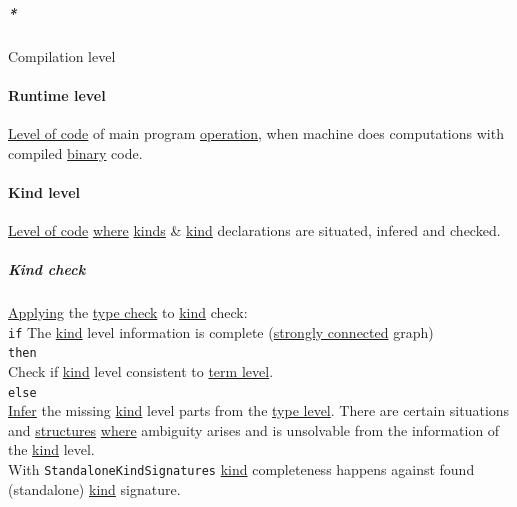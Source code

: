 \documentclass[11pt]{article}
\begin{document}
\subparagraph{\emph{*}}
\label{sec:org372209f}

\label{org0f27178}Compilation level\\

\paragraph{\label{org2ff5101}Runtime level}
\label{sec:orgb93f4a0}
\hyperref[org8bd4e7d]{Level of code} of main program \hyperref[org87d485b]{operation}, when machine does computations with compiled \hyperref[orgee106ab]{binary} code.\\

\paragraph{\label{orgf56aa57}Kind level}
\label{sec:org231736b}
\hyperref[org8bd4e7d]{Level of code} \hyperref[orgefd1ecd]{where} \hyperref[orgfe0ef3e]{kinds} \& \hyperref[org19ec4cb]{kind} declarations are situated, infered and checked.\\

\subparagraph{\label{org1b17986}Kind check}
\label{sec:orgf00bd31}
\hyperref[orgc54ef49]{Applying} the \hyperref[org4fdea01]{type check} to \hyperref[org19ec4cb]{kind} check:\\

\texttt{if} The \hyperref[org19ec4cb]{kind} level information is complete (\hyperref[orgc84d9f9]{strongly connected} graph)\\

\texttt{then}\\

Check if \hyperref[org19ec4cb]{kind} level consistent to \hyperref[org3e856cf]{term level}.\\

\texttt{else}\\

\hyperref[org774bd97]{Infer} the missing \hyperref[org19ec4cb]{kind} level parts from the \hyperref[org01e5da3]{type level}. There are certain situations and \hyperref[org51d1eff]{structures} \hyperref[orgefd1ecd]{where} ambiguity arises and is unsolvable from the information of the \hyperref[org19ec4cb]{kind} level.\\

With \texttt{StandaloneKindSignatures} \hyperref[org19ec4cb]{kind} completeness happens against found (standalone) \hyperref[org19ec4cb]{kind} signature.\\
\end{document}
